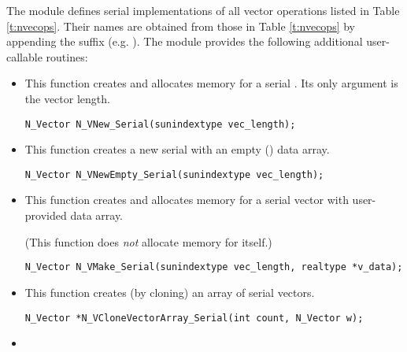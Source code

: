 The {\nvecs} module defines serial implementations of all vector operations listed 
in Table \ref{t:nvecops}. Their names are obtained from those in Table \ref{t:nvecops}
by appending the suffix  (e.g. ).
The module {\nvecs} provides the following additional user-callable routines:
\begin{itemize}


\item {}

  This function creates and allocates memory for a serial .
  Its only argument is the vector length.

  

  \verb|N_Vector N_VNew_Serial(sunindextype vec_length);|


\item {}

  This function creates a new serial  with an empty () data array.

  

  \verb|N_Vector N_VNewEmpty_Serial(sunindextype vec_length);|


\item {}

 This function creates and allocates memory for a serial vector
 with user-provided data array.

 (This function does {\em not} allocate memory for  itself.)

 \verb|N_Vector N_VMake_Serial(sunindextype vec_length, realtype *v_data);|


\item {}

 This function creates (by cloning) an array of  serial vectors.

 

 \verb|N_Vector *N_VCloneVectorArray_Serial(int count, N_Vector w);|


\item {}


\end{itemize}
